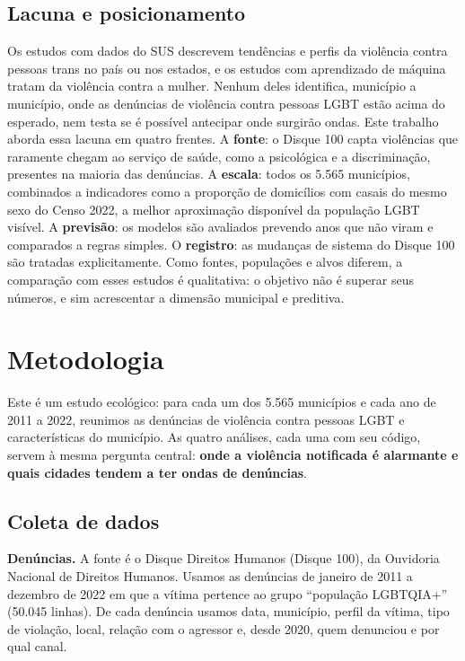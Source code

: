 \documentclass[12pt]{article}
\begin{document}
\subsection{Lacuna e posicionamento}

Os estudos com dados do SUS descrevem tendências e perfis da violência contra pessoas trans no país ou nos estados, e os estudos com aprendizado de máquina tratam da violência contra a mulher. Nenhum deles identifica, município a município, onde as denúncias de violência contra pessoas LGBT estão acima do esperado, nem testa se é possível antecipar onde surgirão ondas. Este trabalho aborda essa lacuna em quatro frentes. A \textbf{fonte}: o Disque 100 capta violências que raramente chegam ao serviço de saúde, como a psicológica e a discriminação, presentes na maioria das denúncias. A \textbf{escala}: todos os 5.565 municípios, combinados a indicadores como a proporção de domicílios com casais do mesmo sexo do Censo 2022, a melhor aproximação disponível da população LGBT visível. A \textbf{previsão}: os modelos são avaliados prevendo anos que não viram e comparados a regras simples. O \textbf{registro}: as mudanças de sistema do Disque 100 são tratadas explicitamente. Como fontes, populações e alvos diferem, a comparação com esses estudos é qualitativa: o objetivo não é superar seus números, e sim acrescentar a dimensão municipal e preditiva.


\section{Metodologia}
\label{sec:metodologia}

Este é um estudo ecológico: para cada um dos 5.565 municípios e cada ano de 2011 a 2022, reunimos as denúncias de violência contra pessoas LGBT e características do município. As quatro análises, cada uma com seu código, servem à mesma pergunta central: \textbf{onde a violência notificada é alarmante e quais cidades tendem a ter ondas de denúncias}.

\subsection{Coleta de dados}

\textbf{Denúncias.} A fonte é o Disque Direitos Humanos (Disque 100), da Ouvidoria Nacional de Direitos Humanos. Usamos as denúncias de janeiro de 2011 a dezembro de 2022 em que a vítima pertence ao grupo ``população LGBTQIA+'' (50.045 linhas). De cada denúncia usamos data, município, perfil da vítima, tipo de violação, local, relação com o agressor e, desde 2020, quem denunciou e por qual canal.
\end{document}
